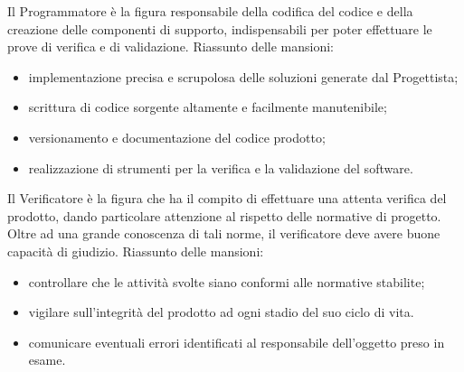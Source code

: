 			Il Programmatore è la figura responsabile della codifica del codice e della creazione delle componenti di supporto, indispensabili per poter effettuare le prove di verifica e di validazione.
			Riassunto delle mansioni:
			\begin{itemize}
				\item implementazione precisa e scrupolosa delle soluzioni generate dal Progettista;
				\item scrittura di codice sorgente altamente e facilmente manutenibile;
				\item versionamento e documentazione del codice prodotto;
				\item realizzazione di strumenti per la verifica e la validazione del software.
			\end{itemize}
		
			Il Verificatore è la figura che ha il compito di effettuare una attenta verifica del prodotto, dando particolare attenzione al rispetto delle normative di progetto. Oltre ad una grande conoscenza di tali norme, il verificatore deve avere buone capacità di giudizio.
			Riassunto delle mansioni:
			\begin{itemize}
				\item controllare che le attività svolte siano conformi alle normative stabilite;
				\item vigilare sull'integrità del prodotto ad ogni stadio del suo ciclo di vita.
				\item comunicare eventuali errori identificati al responsabile dell'oggetto preso in esame.
			\end{itemize}
		
		

